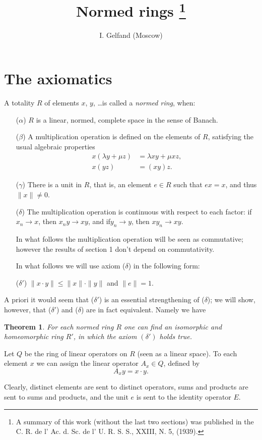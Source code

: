 \documentclass{article}
\title{Normed rings \footnote{A summary of this work (without the last two sections) was published in the C. R. de l' Ac. d. Sc. de l' U. R. S. S., XXIII, N. 5, (1939).}}
\author{I. Gelfand (Moscow)}
\date{}%
\newtheorem{theorem}{Theorem}
\theoremstyle{definition}
\begin{document}
\maketitle

\section{The axiomatics}
A totality $R$ of elements $x$, $y$, \dots is called a \emph{normed ring}, when:
\begin{enumerate}
\item [($\alpha$)] $R$ is a linear, normed, complete space in the sense of Banach.
\item [($\beta$)] A multiplication operation is defined on the elements of $R$, satisfying the usual algebraic properties
  \begin{align*}
    x(\lambda y + \mu z) &= \lambda xy + \mu xz,\\
    x(yz) &= (xy)z.
  \end{align*}
\item [($\gamma$)] There is a unit in $R$, that is, an element $e\in R$ such that $ex=x$, and thus $\| x \| \neq 0$.
\item [($\delta$)]
  The multiplication operation is continuous with respect to each factor: if $x_n \to x$, then $x_n y \to xy$, and if$y_n \to y$, then $xy_n \to xy$.
  
  In what follows the multiplication operation will be seen as commutative; however the results of section 1 don't depend on commutativity.

  In what follows we will use axiom ($\delta$) in the following form:
\item [($\delta'$)] $\|x\cdot y\| \leq \|x\|\cdot\|y\|$ and $\|e\| = 1$.
\end{enumerate}
A priori it would seem that ($\delta'$) is an essential strengthening of ($\delta$); we will show, however, that ($\delta'$) and ($\delta$) are in fact equivalent. Namely we have
\begin{theorem}
  For each normed ring $R$ one can find an isomorphic and homeomorphic ring $R'$, in which the axiom $(\delta')$ holds true.
\end{theorem}
Let $Q$ be the ring of linear operators on $R$ (seen as a linear space). To each element $x$ we can assign the linear operator $A_x\in Q$, defined by
$$A_x y = x\cdot y.$$

Clearly, distinct elements are sent to distinct operators, sums and products are sent to sums and products, and the unit $e$ is sent to the identity operator $E$.
\end{document}
